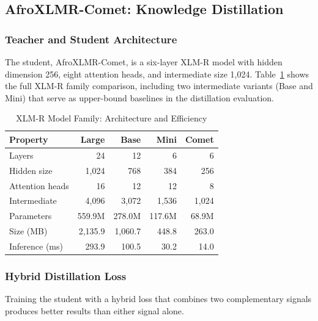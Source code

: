 \documentclass[conference]{IEEEtran}
\begin{document}
\subsection{AfroXLMR-Comet: Knowledge Distillation}\label{sec:distill}

\subsubsection{Teacher and Student Architecture}
The student, AfroXLMR-Comet, is a six-layer XLM-R model with hidden
dimension 256, eight attention heads, and intermediate size 1,024.
Table~\ref{tab:arch} shows the full XLM-R family comparison, including
two intermediate variants (Base and Mini) that serve as upper-bound
baselines in the distillation evaluation.

\begin{table}[htbp]
\caption{XLM-R Model Family: Architecture and Efficiency}
\label{tab:arch}
\begin{center}
\small
\begin{tabular}{lrrrr}
\toprule
\textbf{Property} & \textbf{Large} & \textbf{Base} & \textbf{Mini} & \textbf{Comet} \\
\midrule
Layers            & 24      & 12      & 6      & 6      \\
Hidden size       & 1,024   & 768     & 384    & 256    \\
Attention heads   & 16      & 12      & 12     & 8      \\
Intermediate      & 4,096   & 3,072   & 1,536  & 1,024  \\
\midrule
Parameters        & 559.9M  & 278.0M  & 117.6M & 68.9M  \\
Size (MB)         & 2,135.9 & 1,060.7 & 448.8  & 263.0  \\
Inference (ms)    & 293.9   & 100.5   & 30.2   & 14.0   \\
\bottomrule
\end{tabular}
\end{center}
\end{table}

\subsubsection{Hybrid Distillation Loss}
Training the student with a hybrid loss that combines two complementary
signals produces better results than either signal alone.
\end{document}
